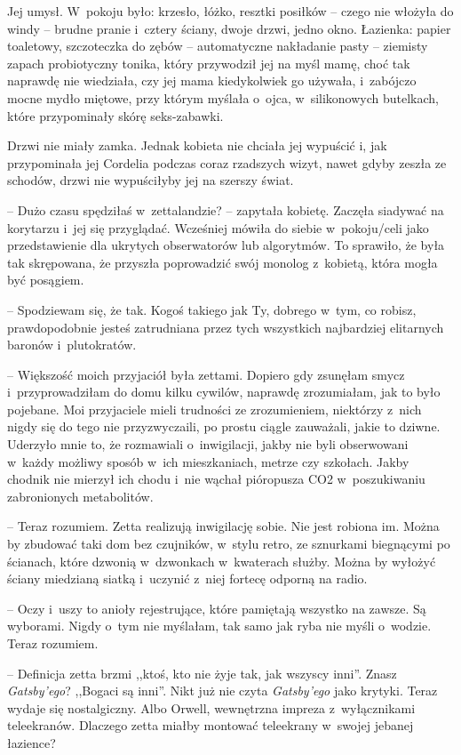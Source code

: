 \documentclass[oneside,polish,11pt,sfheadings]{mwbk}
\begin{document}
Jej umysł. W~pokoju było: krzesło, łóżko, resztki posiłków -- czego nie
włożyła do windy -- brudne pranie i~cztery ściany, dwoje drzwi, jedno
okno. Łazienka: papier toaletowy, szczoteczka do zębów -- automatyczne
nakładanie pasty -- ziemisty zapach probiotyczny tonika, który przywodził
jej na myśl mamę, choć tak naprawdę nie wiedziała, czy jej mama
kiedykolwiek go używała, i~zabójczo mocne mydło miętowe, przy którym
myślała o~ojca, w~silikonowych butelkach, które przypominały skórę
seks-zabawki.

Drzwi nie miały zamka. Jednak kobieta nie chciała jej wypuścić i, jak
przypominała jej Cordelia podczas coraz rzadszych wizyt, nawet gdyby
zeszła ze schodów, drzwi nie wypuściłyby jej na szerszy świat.

-- Dużo czasu spędziłaś w~zettalandzie? -- zapytała kobietę. Zaczęła
siadywać na korytarzu i~jej się przyglądać. Wcześniej mówiła do siebie w~pokoju/celi jako przedstawienie dla ukrytych obserwatorów lub
algorytmów. To sprawiło, że była tak skrępowana, że przyszła poprowadzić
swój monolog z~kobietą, która mogła być posągiem.

-- Spodziewam się, że tak. Kogoś takiego jak Ty, dobrego w~tym, co
robisz, prawdopodobnie jesteś zatrudniana przez tych wszystkich
najbardziej elitarnych baronów i~plutokratów.

-- Większość moich przyjaciół była zettami. Dopiero gdy zsunęłam smycz i~przyprowadziłam do domu kilku cywilów, naprawdę zrozumiałam, jak to było
pojebane. Moi przyjaciele mieli trudności ze zrozumieniem, niektórzy z~nich nigdy się do tego nie przyzwyczaili, po prostu ciągle zauważali,
jakie to dziwne. Uderzyło mnie to, że rozmawiali o~inwigilacji, jakby
nie byli obserwowani w~każdy możliwy sposób w~ich mieszkaniach, metrze
czy szkołach. Jakby chodnik nie mierzył ich chodu i~nie wąchał
pióropusza CO2 w~poszukiwaniu zabronionych metabolitów.

-- Teraz rozumiem. Zetta realizują inwigilację sobie. Nie jest robiona
im. Można by zbudować taki dom bez czujników, w~stylu retro, ze
sznurkami biegnącymi po ścianach, które dzwonią w~dzwonkach w~kwaterach
służby. Można by wyłożyć ściany miedzianą siatką i~uczynić z~niej
fortecę odporną na radio.

-- Oczy i~uszy to anioły rejestrujące, które pamiętają wszystko na
zawsze. Są wyborami. Nigdy o~tym nie myślałam, tak samo jak ryba nie
myśli o~wodzie. Teraz rozumiem.

-- Definicja zetta brzmi ,,ktoś, kto nie żyje tak, jak wszyscy inni''.
Znasz \textit{Gatsby'ego}? ,,Bogaci są inni''. Nikt już nie czyta
\textit{Gatsby'ego} jako krytyki. Teraz wydaje się nostalgiczny. Albo
Orwell, wewnętrzna impreza z~wyłącznikami teleekranów. Dlaczego zetta
miałby montować teleekrany w~swojej jebanej łazience?
\end{document}
